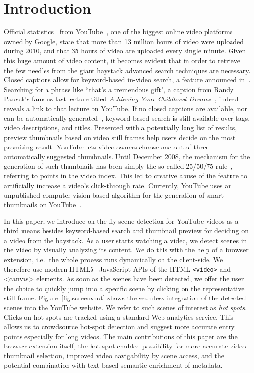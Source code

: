 \documentclass[10pt,twocolumn,letterpaper]{article}
\begin{document}
\section{Introduction}
Official statistics~\cite{youtube:stats} from YouTube~\cite{youtube}, one of the biggest online video platforms owned by Google, state that more than 13 million hours of video were uploaded during 2010, and that 35 hours of video are uploaded every single minute. Given this huge amount of video content, it becomes evident that in order to retrieve the few needles from the giant haystack advanced search techniques are necessary. Closed captions allow for keyword-based in-video search, a feature announced in~\cite{googlevideo}. Searching for a phrase like ``that's a tremendous gift", a caption from Randy Pausch's famous last lecture titled \emph{Achieving Your Childhood Dreams}~\cite{pausch}, indeed reveals a link to that lecture on YouTube. If no closed captions are available, nor can be automatically generated~\cite{youtubecaptions}, keyword-based search is still available over tags, video descriptions, and titles. Presented with a potentially long list of results, preview thumbnails based on video still frames help users decide on the most promising result. YouTube lets video owners choose one out of three automatically suggested thumbnails. Until December 2008, the mechanism for the generation of such thumbnails has been simply the so-called 25/50/75 rule~\cite{youtuberule}, referring to points in the video index. This led to creative abuse of the feature to artificially increase a video's click-through rate. Currently, YouTube uses an unpublished computer vision-based algorithm for the generation of smart thumbnails on YouTube~\cite{googleresearch}.

In this paper, we introduce on-the-fly scene detection for YouTube videos as a third means besides keyword-based search and thumbnail preview for deciding on a video from the haystack. As a user starts watching a video, we detect scenes in the video by visually analyzing its content. We do this with the help of a browser extension, i.e., the whole process runs dynamically on the client-side. We therefore use modern HTML5~\cite{w3c_html5} JavaScript APIs of the HTML \texttt{<video>} and {<canvas>} elements. As soon as the scenes have been detected, we offer the user the choice to quickly jump into a specific scene by clicking on the representative still frame. Figure~\ref{fig:screenshot} shows the seamless integration of the detected scenes into the YouTube website. We refer to such scenes of interest as \emph{hot spots}. Clicks on hot spots are tracked using a standard Web analytics service. This allows us to crowdsource hot-spot detection and suggest more accurate entry points especially for long videos. The main contributions of this paper are the browser extension itself, the hot spot-enabled possibility for more accurate video thumbnail selection, improved video navigability by scene access, and the potential combination with text-based semantic enrichment of metadata.
\end{document}

